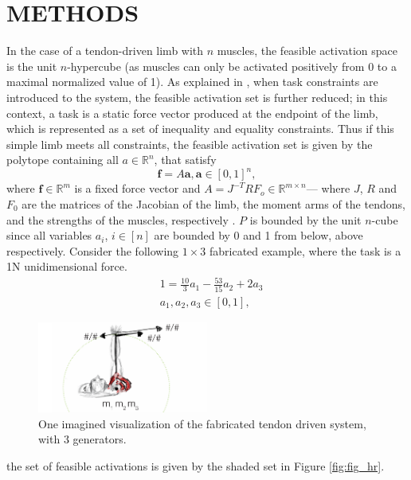 \section{METHODS}
\label{s:methods}
In the case of a tendon-driven limb with $n$ muscles, the feasible activation space is the unit $n$-hypercube (as muscles can only be activated positively from 0 to a maximal normalized value of 1). As explained in \cite{Valero-Cuevas2009mathematical}, when task constraints are introduced to the system, the feasible activation set is further reduced; in this context, a task is a static force vector produced at the endpoint of the limb, which is represented as a set of inequality and equality constraints. Thus if this simple limb meets all constraints, the feasible activation set is given by the polytope containing all $a \in \mathbb{R}^n$, that satisfy
\[\textbf{f} = A\textbf{a}, \textbf{a} \in [0,1]^n,\]
where $\textbf{f} \in \mathbb{R}^m$ is a fixed force vector and $A = J^{-T}RF_o \in \mathbb{R}^{m \times n}$--- where $J$, $R$ and $F_0$ are the matrices of the Jacobian of the limb, the moment arms of the tendons, and the strengths of the muscles, respectively \cite{Valero-Cuevas1998Large,Valero-Cuevas2009mathematical}. $P$ is bounded by the unit $n$-cube since all variables $a_i$, $i \in [n]$ are bounded by 0 and 1 from below, above respectively. 
Consider the following $1 \times 3$ fabricated example, where the task is a 1N unidimensional force.
\begin{align*}
&1 = \frac{10}{3}a_1 - \frac{53}{15}a_2 + 2a_3 \\
&a_1, a_2, a_3 \in [0,1],
\end{align*}



\begin{figure}[schematic_arm]
  \label{fig:schematic_arm}
  \centering
  \includegraphics[width=0.5\textwidth]{sections/figs/schematic_example_drawing.pdf}
  \caption{One imagined visualization of the fabricated tendon driven system, with 3 generators.}
  \label{fig:finger}
\end{figure}


the set of feasible activations is given by the shaded set in Figure \ref{fig:fig_hr}.

